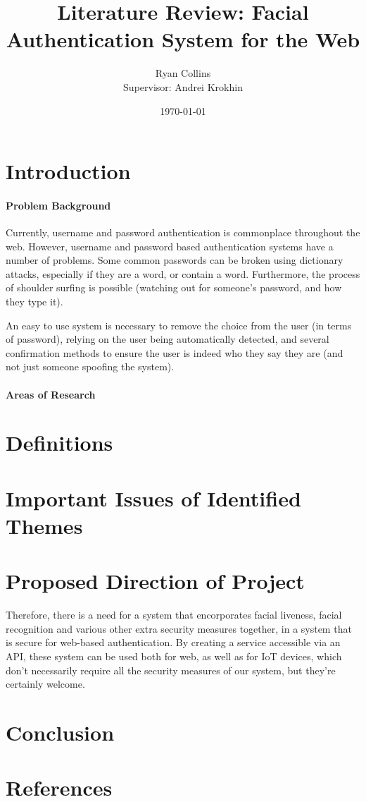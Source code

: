 \documentclass[14pt]{article}
\title{Literature Review: Facial Authentication System for the Web}
\author{
        Ryan Collins\\
        Supervisor: Andrei Krokhin
}
\date{\today}
\begin{document}
\maketitle

\section{Introduction}
\paragraph{Problem Background}
Currently, username and password authentication is commonplace throughout the web. However, username and password
based authentication systems have a number of problems. Some common passwords can be broken using dictionary attacks,
especially if they are a word, or contain a word. Furthermore, the process of shoulder surfing is possible (watching out
for someone's password, and how they type it).

An easy to use system is necessary to remove the choice from the user (in terms of password), relying on the user being automatically
detected, and several confirmation methods to ensure the user is indeed who they say they are (and not just someone spoofing the system).

\paragraph{Areas of Research}


\section{Definitions}


\section{Important Issues of Identified Themes}



\section{Proposed Direction of Project}
Therefore, there is a need for a system that encorporates facial liveness, facial recognition and various other
extra security measures together, in a system that is secure for web-based authentication. By creating a service
accessible via an API, these system can be used both for web, as well as for IoT devices, which don't necessarily require
all the security measures of our system, but they're certainly welcome.
\section{Conclusion}
\section{References}\label{references}
\printbibliography
\end{document}
